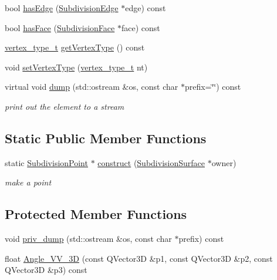 \begin{DoxyCompactItemize}
\item 
bool \hyperlink{classShipCAD_1_1SubdivisionPoint_a3c4e0e7c499ac5a9391b66767899ae1b}{has\+Edge} (\hyperlink{classShipCAD_1_1SubdivisionEdge}{Subdivision\+Edge} $\ast$edge) const 
\item 
bool \hyperlink{classShipCAD_1_1SubdivisionPoint_ae45edc2690d3d7545141f13fba03ffd5}{has\+Face} (\hyperlink{classShipCAD_1_1SubdivisionFace}{Subdivision\+Face} $\ast$face) const 
\item 
\hyperlink{namespaceShipCAD_a03171cc921c53a568b778f5131a60deb}{vertex\+\_\+type\+\_\+t} \hyperlink{classShipCAD_1_1SubdivisionPoint_abc15cbc4faebeb138c1a4a4890a3173b}{get\+Vertex\+Type} () const 
\item 
void \hyperlink{classShipCAD_1_1SubdivisionPoint_a614259dfa2470bbbd7b8cc73039ad501}{set\+Vertex\+Type} (\hyperlink{namespaceShipCAD_a03171cc921c53a568b778f5131a60deb}{vertex\+\_\+type\+\_\+t} nt)
\item 
virtual void \hyperlink{classShipCAD_1_1SubdivisionPoint_aed72cf5e8dc67e980010d195f3a376a3}{dump} (std\+::ostream \&os, const char $\ast$prefix=\char`\"{}\char`\"{}) const 
\begin{DoxyCompactList}\small\item\em print out the element to a stream \end{DoxyCompactList}\end{DoxyCompactItemize}
\subsection*{Static Public Member Functions}
\begin{DoxyCompactItemize}
\item 
static \hyperlink{classShipCAD_1_1SubdivisionPoint}{Subdivision\+Point} $\ast$ \hyperlink{classShipCAD_1_1SubdivisionPoint_a8e907cca747b0483374d4fdde8eb4ad1}{construct} (\hyperlink{classShipCAD_1_1SubdivisionSurface}{Subdivision\+Surface} $\ast$owner)
\begin{DoxyCompactList}\small\item\em make a point \end{DoxyCompactList}\end{DoxyCompactItemize}
\subsection*{Protected Member Functions}
\begin{DoxyCompactItemize}
\item 
void \hyperlink{classShipCAD_1_1SubdivisionPoint_aa2d85a086268f335eefeaef0b48a96a1}{priv\+\_\+dump} (std\+::ostream \&os, const char $\ast$prefix) const 
\item 
float \hyperlink{classShipCAD_1_1SubdivisionPoint_adaabf18eb32ed2a91e1b43f5d4a89854}{Angle\+\_\+\+V\+V\+\_\+3D} (const Q\+Vector3D \&p1, const Q\+Vector3D \&p2, const Q\+Vector3D \&p3) const 
\end{DoxyCompactItemize}
